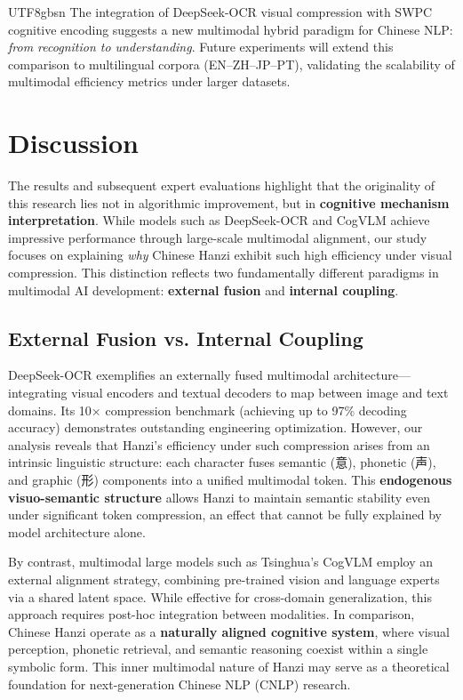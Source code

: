 \documentclass[conference]{IEEEtran}
\begin{document}
\begin{CJK*}{UTF8}{gbsn}
The integration of DeepSeek-OCR visual compression with SWPC cognitive encoding suggests a new multimodal hybrid paradigm for Chinese NLP:  
\textit{from recognition to understanding}.  
Future experiments will extend this comparison to multilingual corpora (EN–ZH–JP–PT), validating the scalability of multimodal efficiency metrics under larger datasets.

\section{Discussion}
\label{sec:discussion}

The results and subsequent expert evaluations highlight that the originality of this research lies not in algorithmic improvement, but in \textbf{cognitive mechanism interpretation}. While models such as DeepSeek-OCR \cite{wei2025deepseek} and CogVLM \cite{wang2024cogvlm} achieve impressive performance through large-scale multimodal alignment, our study focuses on explaining \textit{why} Chinese Hanzi exhibit such high efficiency under visual compression. This distinction reflects two fundamentally different paradigms in multimodal AI development: \textbf{external fusion} and \textbf{internal coupling}.

\subsection{External Fusion vs. Internal Coupling}

DeepSeek-OCR exemplifies an externally fused multimodal architecture—integrating visual encoders and textual decoders to map between image and text domains. Its 10× compression benchmark (achieving up to 97\% decoding accuracy) demonstrates outstanding engineering optimization. However, our analysis reveals that Hanzi’s efficiency under such compression arises from an intrinsic linguistic structure: each character fuses semantic (意), phonetic (声), and graphic (形) components into a unified multimodal token. This \textbf{endogenous visuo-semantic structure} allows Hanzi to maintain semantic stability even under significant token compression, an effect that cannot be fully explained by model architecture alone.

By contrast, multimodal large models such as Tsinghua’s CogVLM employ an external alignment strategy, combining pre-trained vision and language experts via a shared latent space. While effective for cross-domain generalization, this approach requires post-hoc integration between modalities. In comparison, Chinese Hanzi operate as a \textbf{naturally aligned cognitive system}, where visual perception, phonetic retrieval, and semantic reasoning coexist within a single symbolic form. This inner multimodal nature of Hanzi may serve as a theoretical foundation for next-generation Chinese NLP (CNLP) research.


\end{CJK*}
\end{document}
